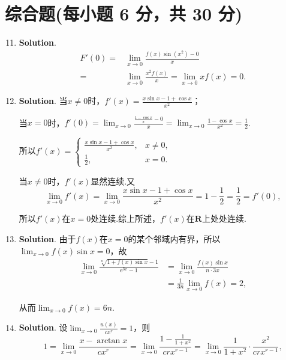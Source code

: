 \documentclass[../Main.tex]{subfiles}
\begin{document}
\section{综合题(每小题 6 分，共 30 分)}
\begin{enumerate}
    \setcounter{enumi}{10}
    \item \textbf{Solution}.
          \[
              \begin{aligned}
                  F'(0)= & \lim_{x\to0}\frac{f(x)\sin(x^2)-0}{x}              \\
                  =      & \lim_{x\to0}\frac{x^2f(x)}{x}=\lim_{x\to0}xf(x)=0.
              \end{aligned}
          \]

    \item \textbf{Solution}. 当$x\neq0$时，$f'(x)=\frac{x\sin x-1+\cos x}{x^{2}}$；

          当$x=0$时，$f'(0)=\lim_{x\to0}\frac{\frac{1-\cos x}{x}-0}{x}=\lim_{x\to0}\frac{1-\cos
                  x}{x^{2}}=\frac{1}{2}$.

          所以$f'(x)=
              \begin{cases}
                  \frac{x\sin x-1+\cos x}{x^2}, & x\neq0, \\
                  \frac{1}{2},                  & x=0.
              \end{cases}$

          当$x\neq0$时，$f'(x)$显然连续.又
          \[
              \lim_{x\to0}f'(x)=\lim_{x\to0}\frac{x\sin x-1+\cos x}{x^{2}}=1-\frac{1}{2}
              =\frac{1}{2}=f'(0),
          \]

          所以$f'(x)$在$x=0$处连续.综上所述，$f'(x)$在$\mathbf{R}$上处处连续.

    \item \textbf{Solution}. 由于$f(x)$在$x=0$的某个邻域内有界，所以$\lim_{x\to0}
              f(x)\sin x=0$，故
          \[
              \begin{aligned}
                  \lim_{x\to0}\frac{\sqrt[n]{1+f(x)\sin x}-1}{\mathrm{e}^{3x}-1} & =\lim_{x\to0}\frac{f(x)\sin x}{n\cdot 3x} \\
                                                                                 & = \frac{1}{3n}\lim_{x\to0}f(x)=2,
              \end{aligned}
          \]

          从而$\lim_{x\to0}f(x)=6n$.

    \item \textbf{Solution}. 设$\lim_{x\to0}\frac{u(x)}{cx^{r}}=1$，则
          \[
              1=\lim_{x\to0}\frac{x-\arctan x}{cx^{r}}=\lim_{x\to0}\frac{1-\frac{1}{1+x^{2}}}{crx^{r-1}}
              =\lim_{x\to0}\frac{1}{1+x^{2}}\cdot\frac{x^{2}}{crx^{r-1}},
          \]


\end{enumerate}
\end{document}
